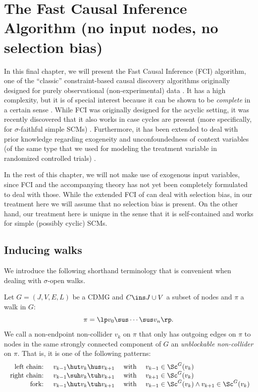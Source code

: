 \section{The Fast Causal Inference Algorithm (no input nodes, no selection bias)}\label{sec:fci}


In this final chapter, we will present the Fast Causal Inference (FCI)
algorithm, one of the ``classic'' constraint-based causal discovery algorithms
originally designed for purely observational (non-experimental) data \cite{SMR1995,SMR1999}.
It has a high complexity, but it is of special interest because
it can be shown to be \emph{complete} in a certain sense \cite{Zhang2008_AI}. 
While FCI was originally designed for
the acyclic setting, it was recently discovered that it also works in case cycles
are present (more specifically, for $\sigma$-faithful simple SCMs) \cite{MooijClaassen_UAI_20}.
Furthermore, it has been extended
to deal with prior knowledge regarding exogeneity and unconfoundedness of context
variables (of the same type that we used for modeling the treatment variable in
randomized controlled trials) \cite{Mooij++_JMLR_20}.

In the rest of this chapter, we will not make use of exogenous input variables, since FCI and the accompanying theory has not yet been completely formulated to deal with those.
While the extended FCI of \cite{SMR1999} can deal with selection bias, in our treatment here we will assume that no selection bias is present.
On the other hand, our treatment here is unique in the sense that it is self-contained and works for simple (possibly cyclic) SCMs.

\subsection{Inducing walks}

We introduce the following shorthand terminology that is convenient when dealing with $\sigma$-open walks.
\begin{Def}\label{def:unblockable_noncollider}
  Let $G=(J,V,E,L)$ be a CDMG and $C \ins J \cup V$ a subset of nodes and $\pi$ a walk in $G$:
  \[ \pi =\lp  v_0 \sus \cdots \sus v_n \rp.  \]
  We call a non-endpoint non-collider $v_k$ on $\pi$ that only has outgoing edges on $\pi$ to nodes in the same strongly connected component of $G$ an \emph{unblockable non-collider} on $\pi$. 
  That is, it is one of the following patterns:
  \[\begin{array}{rccl}
    \text{ left chain: } & v_{k-1} \hut v_k \hus v_{k+1} & \text{ with } & v_{k-1} \in \Sc^G(v_{k})\\
    \text{ right chain: } & v_{k-1} \suh v_k \tuh v_{k+1} & \text{ with } & v_{k+1} \in \Sc^G(v_{k})\\
    \text{ fork: } & v_{k-1} \hut v_k \tuh v_{k+1} & \text{ with } & v_{k-1} \in \Sc^G(v_k) \land v_{k+1} \in \Sc^G(v_k)
  \end{array}\]
\end{Def}

